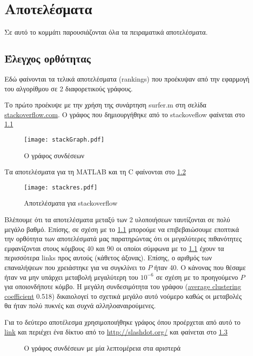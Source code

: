 \chapter{Αποτελέσματα}
Σε αυτό το κομμάτι παρουσιάζονται όλα τα πειραματικά αποτελέσματα.
\section{Έλεγχος ορθότητας}
Εδώ φαίνονται τα τελικά αποτελέσματα (rankings) που προέκυψαν από την εφαρμογή του αλγορίθμου σε 2 διαφορετικούς γράφους.

Το πρώτο προέκυψε με την χρήση της συνάρτηση surfer.m στη σελίδα \href{http://stackoverflow.com/}{stackoverflow.com}.
O γράφος που δημιουργήθηκε από το stackoveflow φαίνεται στο
\hyperref[fig:stackGraph]{\figurename{} \ref{fig:stackGraph}}
\begin{figure}[h]
	\centerline{\texttt{[image: stackGraph.pdf]}}
	\caption{Ο γράφος συνδέσεων}
	\label{fig:stackGraph}
\end{figure}
 
Τα αποτελέσματα για τη MATLAB και τη C φαίνονται στο \hyperref[fig:stackres]{\figurename{} \ref{fig:stackres}}
\begin{figure}[h]
	\centerline{\texttt{[image: stackres.pdf]}}
	\caption{Αποτελέσματα για stackoverflow}
	\label{fig:stackres}
\end{figure}
 
Βλέπουμε ότι τα αποτελέσματα μεταξύ των 2 υλοποιήσεων ταυτίζονται σε πολύ μεγάλο βαθμό.
Επίσης, σε σχέση με το
\hyperref[fig:stackGraph]{\figurename{} \ref{fig:stackGraph}}
μπορούμε να επιβεβαιώσουμε  εποπτικά την ορθότητα των αποτελέσματά μας
παρατηρώντας ότι οι μεγαλύτερες πιθανότητες εμφανίζονται στους κόμβους 40 και 90
οι οποίοι  σύμφωνα με το 
\hyperref[fig:stackGraph]{\figurename{} \ref{fig:stackGraph}}
έχουν τα περισσότερα links προς αυτούς (κάθετος άξονας).
Επίσης, ο αριθμός των επαναλήψεων που χρειάστηκε για να συγκλίνει το $P$ ήταν 40.
Ο κάνονας που θέσαμε ήταν να μην υπάρχει μεταβολή μεγαλύτερη του $10^{-6}$ σε σχέση με το προηγούμενο $P$ για οποιονδήποτε κόμβο.
Η μεγάλη συνδεσιμότητα του γράφου
(\href{https://en.wikipedia.org/wiki/Clustering_coefficient#Global_clustering_coefficient}{average clustering coefficient} 0.518)
δικαιολογεί το σχετικά μεγάλο αυτό νούμερο καθώς οι μεταβολές θα ήταν πολύ πυκνές και συχνά αλληλοαναιρούμενες.

\newpage

Για το δεύτερο αποτέλεσμα χρησιμοποιήθηκε γράφος όπου προέρχεται από αυτό το
\href{http://snap.stanford.edu/data/soc-Slashdot0811.html}{link} 
και περιέχει ένα δίκτυο από το
\href{http://slashdot.org/}{http://slashdot.org/}
και φαίνεται στο
\hyperref[fig:slashGraph]{\figurename{} \ref{fig:slashGraph}}
\begin{figure}[h!]
	\centering
	\caption{O γράφος συνδέσεων με μία λεπτομέρεια στα αριστερά}
	\label{fig:slashGraph}
\end{figure}

